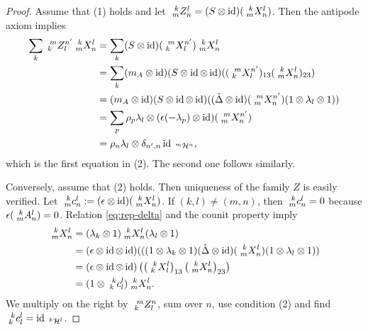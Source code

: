 \begin{proof}
   Assume that (1) holds and let  $\Gr{Z}{k}{l}{m}{n}=(S \otimes
   \id)(\Gr{X}{k}{l}{m}{n})$. Then the antipode axiom implies
   \begin{align*}
     \sum_{k} \Gr{Z}{m}{n'}{k}{l} \Gr{X}{k}{l}{m}{n} &= \sum_{k}
     (S\otimes \id)(\Gr{X}{m}{n'}{k}{l}) \Gr{X}{k}{l}{m}{n}
     \\
     &=\sum_{k} (m_{A} \otimes \id)(S\otimes \id \otimes \id) (
     (\Gr{X}{m}{n
       '}{k}{l})_{13}(\Gr{X}{k}{l}{m}{n})_{23}) \\
     &= (m_{A} \otimes \id)(S\otimes \id \otimes \id)((\tilde \Delta
     \otimes \id)(\Gr{X}{m}{n'}{m}{n})(1 \otimes \lambda_{l}\otimes
     1)) \\
     &= \sum_{p} \rho_{p}\lambda_{l} \otimes (\epsilon(-\lambda_{p}
    ) \otimes \id)(\Gr{X}{m}{n'}{m}{n}) \\
     &= \rho_{n}\lambda_{l} \otimes \delta_{n',n}
     \id_{\Gru{\mathcal{H}}{m}{n}},
   \end{align*}
   which is the first equation in (2). The second one follows
   similarly.

   Conversely, assume that (2) holds. Then uniqueness of the family
   $Z$ is easily verified. Let $\Gr{c}{k}{l}{m}{n}:=(\epsilon \otimes
   \id)(\Gr{X}{k}{l}{m}{n})$.  If $(k,l)\neq (m,n)$, then
   $\Gr{c}{k}{l}{m}{n} = 0$ because
   $\epsilon(\Gr{A}{k}{l}{m}{n})=0$. Relation \eqref{eq:rep-delta} and
   the counit property imply
\begin{align*}
  \Gr{X}{k}{l}{m}{n} &=
  (\lambda_{k} \otimes 1)\Gr{X}{k}{l}{m}{n}(\lambda_{l}\otimes 1) \\
  &= (\epsilon \otimes \id \otimes \id)(((1 \otimes \lambda_{k} \otimes
  1)(\hat \Delta \otimes \id)(\Gr{X}{k}{l}{m}{n})(1 \otimes \lambda_{l}
  \otimes 1)) \\ &=(\epsilon \otimes \id \otimes \id)
  \left(\left(\Gr{X}{k}{l}{k}{l}\right)_{13}\left(\Gr{X}{k}{l}{m}{n}\right)_{23}\right)
\\ &  = (1 \otimes \Gr{c}{k}{l}{k}{l}) \Gr{X}{k}{l}{m}{n}.
   \end{align*}
   We multiply on the right by $\Gr{Z}{m}{n}{k}{l}$, sum over $n$, use
   condition (2) and find
   $\Gr{c}{k}{l}{k}{l}=\id_{\Gru{\mathcal{H}}{k}{l}}$.
\end{proof}

